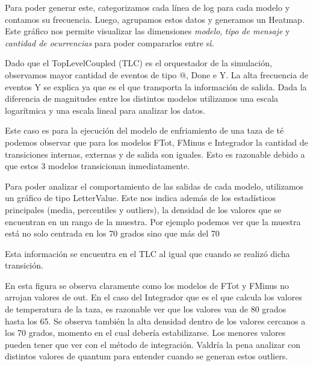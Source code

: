 Para poder generar este, categorizamos cada línea de log para cada modelo y
contamos su frecuencia. Luego, agrupamos estos datos y generamos un Heatmap.
Este gráfico nos permite visualizar las dimensiones \textit{modelo}, \textit{tipo de mensaje } y
\textit{cantidad de ocurrencias} para poder compararlos entre sí.

Dado que el TopLevelCoupled (TLC)  es el orquestador de la simulación, observamos mayor cantidad de eventos de tipo @, Done e Y. La alta frecuencia de eventos Y se explica ya que es el que transporta la información de salida. Dada la diferencia de magnitudes entre los distintos modelos utilizamos una escala logarítmica y una escala lineal para analizar los datos.

Este caso es para la ejecución del modelo de enfriamiento de una taza de té podemos observar que para los modelos FTot, FMinus e Integrador la cantidad de transiciones internas, externas y de salida son iguales. Esto es razonable debido a que estos 3 modelos transicionan inmediatamente.

Para poder analizar el comportamiento de las salidas de cada modelo, utilizamos un gráfico de tipo LetterValue. Este nos indica además de los estadísticos principales (media, percentiles y outliers), la densidad de los valores que se encuentran en un rango de la muestra. Por ejemplo podemos ver que la muestra está no solo centrada en los 70 grados sino que más del 70%

Esta información se encuentra en el TLC al igual que cuando se realizó dicha transición.

En esta figura se observa claramente como los modelos de FTot y FMinus no arrojan valores de out. En el caso del Integrador que es el que calcula los valores de temperatura de la taza, es razonable ver que los valores van de 80 grados hasta los 65. Se observa también la alta densidad dentro de los valores cercanos a los 70 grados, momento en el cual debería estabilizarse. Los menores valores pueden tener que ver con el método de integración. Valdría la pena analizar con distintos valores de quantum para entender cuando se generan estos outliers.


